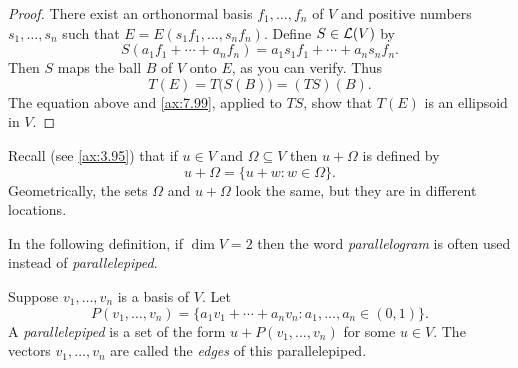 \begin{proof}
There exist an orthonormal basis $f_1,\dots,f_n$ of $V$ and positive numbers
$s_1,\dots,s_n$ such that $E=E(s_1f_1,\dots,s_nf_n)$. Define $S\in\mathcal{L}(V)$ by
\[ S(a_1f_1+\cdots+a_nf_n) = a_1s_1f_1+\cdots+a_ns_nf_n. \]
Then $S$ maps the ball $B$ of $V$ onto $E$, as you can verify. Thus
\[ T(E) = T\bigl(S(B)\bigr) = (TS)(B). \]
The equation above and \ref{ax:7.99}, applied to $TS$, show that $T(E)$ is an
ellipsoid in $V$.
\end{proof}

Recall (see \ref{ax:3.95}) that if $u\in V$ and $\Omega\subseteq V$ then
$u+\Omega$ is defined by
\[ u+\Omega = \{u+w : w\in\Omega\}. \]
Geometrically, the sets $\Omega$ and $u+\Omega$ look the same, but they are in
different locations.

In the following definition, if $\dim V=2$ then the word
\emph{parallelogram} is often used instead of \emph{parallelepiped}.

\begin{definition}\label{ax:7.102}
Suppose $v_1,\dots,v_n$ is a basis of $V$. Let
\[ P(v_1,\dots,v_n) = \{a_1v_1+\cdots+a_nv_n : a_1,\dots,a_n\in(0,1)\}. \]
A \emph{parallelepiped} is a set of the form $u+P(v_1,\dots,v_n)$ for some
$u\in V$. The vectors $v_1,\dots,v_n$ are called the \emph{edges} of this
parallelepiped.
\end{definition}

